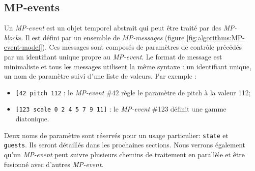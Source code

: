 \subsection{MP-events}

\noindent Un \textit{MP-event} est un objet temporel abstrait qui peut être traité par des \textit{MP-blocks}. Il est défini par un ensemble de \textit{MP-messages} (figure \ref{fig:algorithms:MP-event-model}). Ces messages sont composés de paramètres de contrôle précédés par un identifiant unique propre au \textit{MP-event}. Le format de message est minimaliste et tous les messages utilisent la même syntaxe : un identifiant unique, un nom de paramètre suivi d'une liste de valeurs. Par exemple :
\vspace{-1em}
\begin{itemize}[noitemsep]
	\item{\verb|[42 pitch 112| : le \textit{MP-event} \#42 règle le paramètre de pitch à la valeur 112;}
	\item{\verb|[123 scale 0 2 4 5 7 9 11]| : le \textit{MP-event} \#123 définit une gamme diatonique.}
\end{itemize}

\noindent Deux noms de paramètre sont réservés pour un usage particulier: \texttt{state} et \texttt{guests}. Ils seront détaillés dans les prochaines sections. Nous verrons également qu'un \textit{MP-event} peut suivre plusieurs chemins de traitement en parallèle et être fusionné avec d'autres \textit{MP-event}. 


